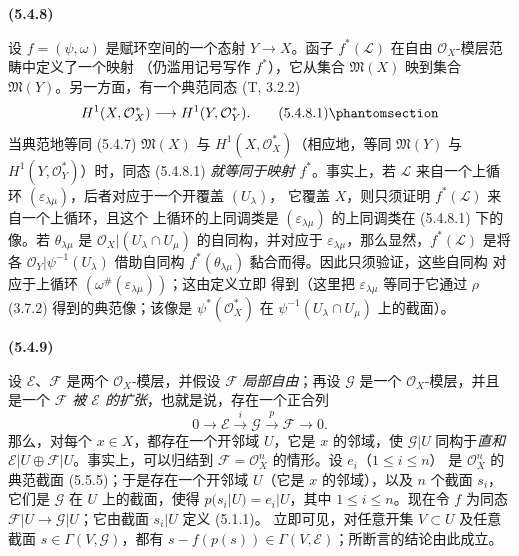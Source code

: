 \documentclass[UTF8,fontset=none,11pt,oneside,openany]{ctexbook}
\newenvironment{env}[1][]{%
  \par\medskip\noindent\textbf{(#1)}\ %
}{\par}
\let\EGAOriginalLabel\label
\renewcommand{\label}[1]{\phantomsection\EGAOriginalLabel{#1}}
\begin{document}
\begin{env}[5.4.8]
\label{0.5.4.8-fr}
设 $f=(\psi,\omega)$ 是赋环空间的一个态射 $Y\to X$。函子
$f^*(\mathcal{L})$ 在自由 $\mathcal{O}_X$-模层范畴中定义了一个映射
（仍滥用记号写作 $f^*$），它从集合 $\mathfrak{M}(X)$ 映到集合
$\mathfrak{M}(Y)$。另一方面，有一个典范同态 (T, 3.2.2)
\[
  H^1(X,\mathcal{O}_X^*)\longrightarrow H^1(Y,\mathcal{O}_Y^*).
  \tag{5.4.8.1}\label{0.5.4.8.1-fr}
\]
当典范地等同 (5.4.7) $\mathfrak{M}(X)$ 与
$H^1(X,\mathcal{O}_X^*)$（相应地，等同 $\mathfrak{M}(Y)$ 与
$H^1(Y,\mathcal{O}_Y^*)$）时，同态 (5.4.8.1)
\emph{就等同于映射 $f^*$}。事实上，若 $\mathcal{L}$ 来自一个上循环
$(\varepsilon_{\lambda\mu})$，后者对应于一个开覆盖 $(U_\lambda)$，
它覆盖 $X$，则只须证明 $f^*(\mathcal{L})$ 来自一个上循环，且这个
上循环的上同调类是 $(\varepsilon_{\lambda\mu})$ 的上同调类在
(5.4.8.1) 下的像。若 $\theta_{\lambda\mu}$ 是
$\mathcal{O}_X|(U_\lambda\cap U_\mu)$ 的自同构，并对应于
$\varepsilon_{\lambda\mu}$，那么显然，$f^*(\mathcal{L})$ 是将各
$\mathcal{O}_Y|\psi^{-1}(U_\lambda)$ 借助自同构
$f^*(\theta_{\lambda\mu})$ 黏合而得。因此只须验证，这些自同构
对应于上循环 $(\omega^\#(\varepsilon_{\lambda\mu}))$；这由定义立即
得到（这里把 $\varepsilon_{\lambda\mu}$ 等同于它通过 $\rho$
(3.7.2) 得到的典范像；该像是 $\psi^*(\mathcal{O}_X^*)$ 在
$\psi^{-1}(U_\lambda\cap U_\mu)$ 上的截面）。
\end{env}

\begin{env}[5.4.9]
\label{0.5.4.9-fr}
设 $\mathcal{E}$、$\mathcal{F}$ 是两个 $\mathcal{O}_X$-模层，并假设
$\mathcal{F}$ \emph{局部自由}；再设 $\mathcal{G}$ 是一个
$\mathcal{O}_X$-模层，并且是一个
\emph{$\mathcal{F}$ 被 $\mathcal{E}$ 的扩张}，也就是说，存在一个正合列
\[
  0\longrightarrow\mathcal{E}\xrightarrow{i}\mathcal{G}
  \xrightarrow{p}\mathcal{F}\longrightarrow 0.
\]
那么，对每个 $x\in X$，都存在一个开邻域 $U$，它是 $x$ 的邻域，使
$\mathcal{G}|U$ 同构于\emph{直和}
$\mathcal{E}|U\oplus\mathcal{F}|U$。事实上，可以归结到
$\mathcal{F}=\mathcal{O}_X^n$ 的情形。设 $e_i$（$1\leq i\leq n$）
是 $\mathcal{O}_X^n$ 的典范截面 (5.5.5)；于是存在一个开邻域
$U$（它是 $x$ 的邻域），以及 $n$ 个截面 $s_i$，它们是
$\mathcal{G}$ 在 $U$ 上的截面，使得
$p(s_i|U)=e_i|U$，其中 $1\leq i\leq n$。现在令 $f$ 为同态
$\mathcal{F}|U\to\mathcal{G}|U$；它由截面 $s_i|U$ 定义 (5.1.1)。
立即可见，对任意开集 $V\subset U$ 及任意截面
$s\in\Gamma(V,\mathcal{G})$，都有
$s-f(p(s))\in\Gamma(V,\mathcal{E})$；所断言的结论由此成立。
\end{env}
\end{document}
